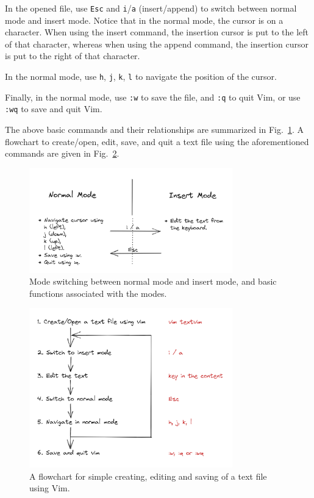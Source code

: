 In the opened file, use \verb|Esc| and \verb|i|/\verb|a| (insert/append) to switch between normal mode and insert mode. Notice that in the normal mode, the cursor is on a character. When using the insert command, the insertion cursor is put to the left of that character, whereas when using the append command, the insertion cursor is put to the right of that character. 

In the normal mode, use \verb|h|, \verb|j|, \verb|k|, \verb|l| to navigate the position of the cursor. 

Finally, in the normal mode, use \verb|:w| to save the file, and \verb|:q| to quit Vim, or use \verb|:wq| to save and quit Vim.

The above basic commands and their relationships are summarized in Fig.~\ref{ch:tfe:fig:vimbasicmodeswitching}. A flowchart to create/open, edit, save, and quit a text file using the aforementioned commands are given in Fig.~\ref{ch:tfe:fig:vimbasicoperationflowchart}.

\begin{figure}[!htb]
\centering
\includegraphics[width=250pt]{chapters/part-1/figures/vimbasicmodeswitching.png}
\caption{Mode switching between normal mode and insert mode, and basic functions associated with the modes.} \label{ch:tfe:fig:vimbasicmodeswitching}
\end{figure}

\begin{figure}[!htb]
\centering
\includegraphics[width=250pt]{chapters/part-1/figures/vimbasicoperationflowchart.png}
\caption{A flowchart for simple creating, editing and saving of a text file using Vim.} \label{ch:tfe:fig:vimbasicoperationflowchart}
\end{figure}

